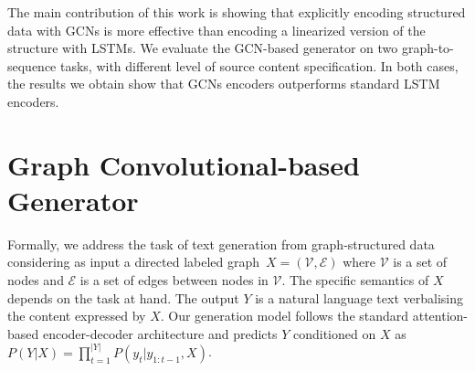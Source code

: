\documentclass[11pt,a4paper,dvipsnames]{article}
\begin{document}
The main contribution of this work is showing that explicitly encoding structured data with GCNs is more effective than encoding a linearized version of the structure with LSTMs.
We evaluate the GCN-based generator on two 
graph-to-sequence tasks, with different level of source content specification.
In both cases, the results we obtain show that GCNs encoders outperforms standard 
LSTM encoders. 



\section{Graph Convolutional-based Generator}
\label{sec:d2tmodel}


Formally, we address the task of text generation from 
graph-structured data considering as input a directed labeled 
graph~$X=(\mathcal{V}, \mathcal{E})$ where $\mathcal{V}$ is a set 
of nodes and $\mathcal{E}$ is a set of edges between nodes 
in $\mathcal{V}$. The specific semantics of $X$ depends on the task at hand. 
The output $Y$ is a natural language text verbalising the content expressed by $X$.
Our generation model follows the standard attention-based encoder-decoder 
architecture \cite{bahdanau2015neural,luong2015effective} and predicts $Y$
conditioned on $X$ as $ P(Y|X) = \prod_{t=1}^{|Y|} P(y_t|y_{1:t-1}, X)$.
\end{document}
